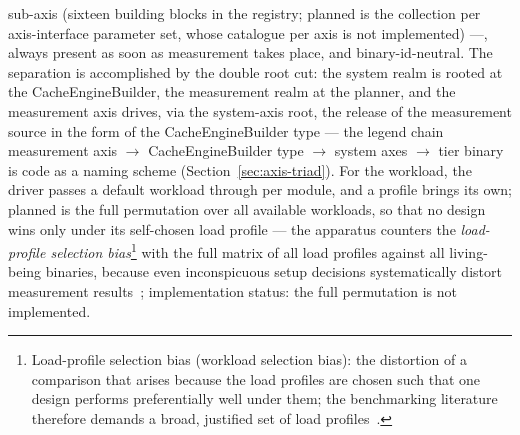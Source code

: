 \begin{nurlang}
sub-axis (sixteen building blocks in the registry; planned is the collection per axis-interface
parameter set, whose catalogue per axis is not implemented) ---, always present as soon as
measurement takes place, and binary-id-neutral. The separation is accomplished by the double root
cut: the system realm is rooted at the CacheEngineBuilder, the measurement realm at the planner, and
the measurement axis drives, via the system-axis root, the release of the measurement source in the
form of the CacheEngineBuilder type --- the legend chain measurement axis $\to$ CacheEngineBuilder
type $\to$ system axes $\to$ tier binary is code as a naming scheme
(Section~\ref{sec:axis-triad}). For the workload, the driver passes a default workload through per
module, and a profile brings its own; planned is the full permutation over all available workloads,
so that no design wins only under its self-chosen load profile --- the apparatus counters the
\emph{load-profile selection bias}\footnote{Load-profile selection bias (workload selection bias):
the distortion of a comparison that arises because the load profiles are chosen such that one
design performs preferentially well under them; the benchmarking literature therefore demands a
broad, justified set of load profiles~\cite{blackburn2006dacapo,blackburn2016truth}.} with the full
matrix of all load profiles against all living-being binaries, because even inconspicuous setup
decisions systematically distort measurement results~\cite{mytkowicz2009wrongdata}; implementation
status: the full permutation is not implemented.
\end{nurlang}
